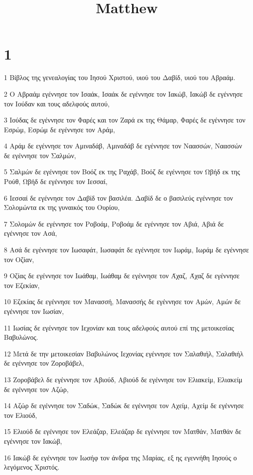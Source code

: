 

\title{Matthew}


\chapter{1}

\par 1 Βίβλος της γενεαλογίας του Ιησού Χριστού, υιού του Δαβίδ, υιού του Αβραάμ.
\par 2 Ο Αβραάμ εγέννησε τον Ισαάκ, Ισαάκ δε εγέννησε τον Ιακώβ, Ιακώβ δε εγέννησε τον Ιούδαν και τους αδελφούς αυτού,
\par 3 Ιούδας δε εγέννησε τον Φαρές και τον Ζαρά εκ της Θάμαρ, Φαρές δε εγέννησε τον Εσρώμ, Εσρώμ δε εγέννησε τον Αράμ,
\par 4 Αράμ δε εγέννησε τον Αμιναδάβ, Αμιναδάβ δε εγέννησε τον Ναασσών, Ναασσών δε εγέννησε τον Σαλμών,
\par 5 Σαλμών δε εγέννησε τον Βοόζ εκ της Ραχάβ, Βοόζ δε εγέννησε τον Ωβήδ εκ της Ρούθ, Ωβήδ δε εγέννησε τον Ιεσσαί,
\par 6 Ιεσσαί δε εγέννησε τον Δαβίδ τον βασιλέα. Δαβίδ δε ο βασιλεύς εγέννησε τον Σολομώντα εκ της γυναικός του Ουρίου,
\par 7 Σολομών δε εγέννησε τον Ροβοάμ, Ροβοάμ δε εγέννησε τον Αβιά, Αβιά δε εγέννησε τον Ασά,
\par 8 Ασά δε εγέννησε τον Ιωσαφάτ, Ιωσαφάτ δε εγέννησε τον Ιωράμ, Ιωράμ δε εγέννησε τον Οζίαν,
\par 9 Οζίας δε εγέννησε τον Ιωάθαμ, Ιωάθαμ δε εγέννησε τον Άχαζ, Άχαζ δε εγέννησε τον Εζεκίαν,
\par 10 Εζεκίας δε εγέννησε τον Μανασσή, Μανασσής δε εγέννησε τον Αμών, Αμών δε εγέννησε τον Ιωσίαν,
\par 11 Ιωσίας δε εγέννησε τον Ιεχονίαν και τους αδελφούς αυτού επί της μετοικεσίας Βαβυλώνος.
\par 12 Μετά δε την μετοικεσίαν Βαβυλώνος Ιεχονίας εγέννησε τον Σαλαθιήλ, Σαλαθιήλ δε εγέννησε τον Ζοροβάβελ,
\par 13 Ζοροβάβελ δε εγέννησε τον Αβιούδ, Αβιούδ δε εγέννησε τον Ελιακείμ, Ελιακείμ δε εγέννησε τον Αζώρ,
\par 14 Αζώρ δε εγέννησε τον Σαδώκ, Σαδώκ δε εγέννησε τον Αχείμ, Αχείμ δε εγέννησε τον Ελιούδ,
\par 15 Ελιούδ δε εγέννησε τον Ελεάζαρ, Ελεάζαρ δε εγέννησε τον Ματθάν, Ματθάν δε εγέννησε τον Ιακώβ,
\par 16 Ιακώβ δε εγέννησε τον Ιωσήφ τον άνδρα της Μαρίας, εξ ης εγεννήθη Ιησούς ο λεγόμενος Χριστός.
